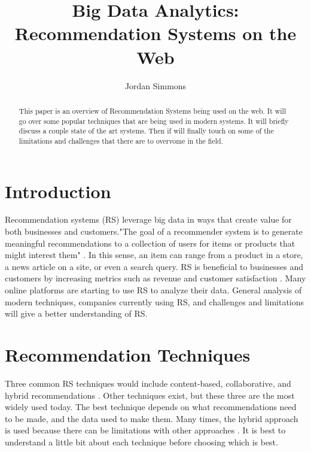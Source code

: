 \documentclass[sigconf]{acmart}
\begin{document}
\title{Big Data Analytics: Recommendation Systems on the Web}


\author{Jordan Simmons}

\renewcommand{\shortauthors}{B. Trovato et al.}


\begin{abstract}
This paper is an overview of Recommendation Systems being used on the web. It will go over some popular techniques that are being used in modern systems. It will briefly discuss a couple state of the art systems. Then if will finally touch on some of the limitations and challenges that there are to overvome in the field.
\end{abstract}



\maketitle

\section{Introduction}

Recommendation systems (RS)  leverage big data in ways that create value for both businesses and customers."The goal of a recommender system is to generate meaningful recommendations to a collection of users for items or products that might interest them" \cite{Melville2010}. In this sense, an item can range from a product in a store, a news article on a site, or even a search query. RS is beneficial to businesses and customers by increasing metrics such as revenue and customer satisfaction \cite{Amatriain2006}. Many online platforms are starting to use RS to analyze their data. General analysis of modern techniques, companies currently using RS, and challenges and limitations will give a better understanding of RS.

\section{Recommendation Techniques}
Three common RS techniques would include content-based, collaborative, and hybrid recommendations \cite{Adomavicius2005}. Other techniques exist, but these three are the most widely used today. The best technique depends on what recommendations need to be made, and the data used to make them. Many times, the hybrid approach is used because there can be limitations with other approaches \cite{Adomavicius2005}. It is best to understand a little bit about each technique before choosing which is best. 
\end{document}
